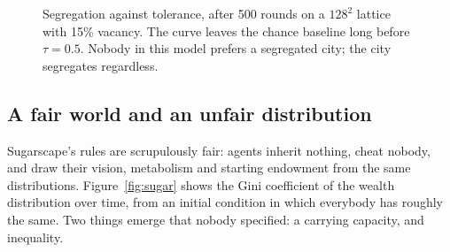 \documentclass[11pt,a4paper]{article}
\begin{document}
\begin{figure}[t]
\centering
{}
\caption{Segregation against tolerance, after 500 rounds on a $128^2$ lattice
with 15\% vacancy. The curve leaves the chance baseline long before $\tau=0.5$.
Nobody in this model prefers a segregated city; the city segregates regardless.}
\label{fig:schelling}
\end{figure}

\subsection{A fair world and an unfair distribution}

Sugarscape's rules are scrupulously fair: agents inherit nothing, cheat nobody,
and draw their vision, metabolism and starting endowment from the same
distributions. Figure~\ref{fig:sugar} shows the Gini coefficient of the wealth
distribution over time, from an initial condition in which everybody has roughly
the same. Two things emerge that nobody specified: a carrying capacity, and
inequality.
\end{document}
